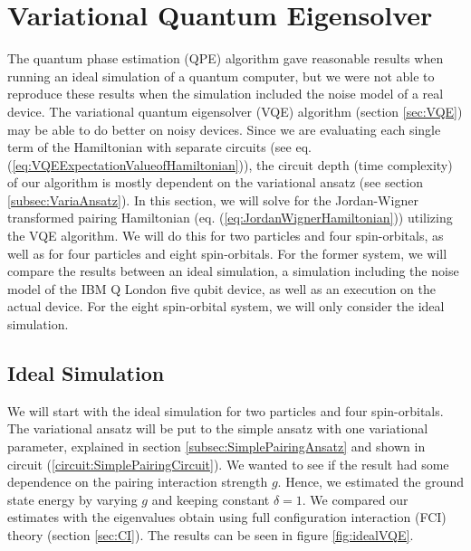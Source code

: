 \section{Variational Quantum Eigensolver}
\label{sec:ResultsVQE}
The quantum phase estimation (QPE) algorithm gave reasonable results when running an ideal simulation of a quantum computer, but we were not able to reproduce these results when the simulation included the noise model of a real device. The variational quantum eigensolver (VQE) algorithm (section \ref{sec:VQE}) may be able to do better on noisy devices. Since we are evaluating each single term of the Hamiltonian with separate circuits (see eq. (\ref{eq:VQEExpectationValueofHamiltonian})), the circuit depth (time complexity) of our algorithm is mostly dependent on the variational ansatz (see section \ref{subsec:VariaAnsatz}). In this section, we will solve for the Jordan-Wigner transformed pairing Hamiltonian (eq. (\ref{eq:JordanWignerHamiltonian})) utilizing the VQE algorithm. We will do this for two particles and four spin-orbitals, as well as for four particles and eight spin-orbitals. For the former system, we will compare the results between an ideal simulation, a simulation including the noise model of the IBM Q London five qubit device, as well as an execution on the actual device. For the eight spin-orbital system, we will only consider the ideal simulation.

\subsection{Ideal Simulation}
\label{subsubsec:ResVQEPairingIdeal}
We will start with the ideal simulation for two particles and four spin-orbitals. The variational ansatz will be put to the simple ansatz with one variational parameter, explained in section \ref{subsec:SimplePairingAnsatz} and shown in circuit (\ref{circuit:SimplePairingCircuit}). We wanted to see if the result had some dependence on the pairing interaction strength $g$. Hence, we estimated the ground state energy by varying $g$ and keeping constant $\delta = 1$. We compared our estimates with the eigenvalues obtain using full configuration interaction (FCI) theory (section \ref{sec:CI}). The results can be seen in figure \ref{fig:idealVQE}.

